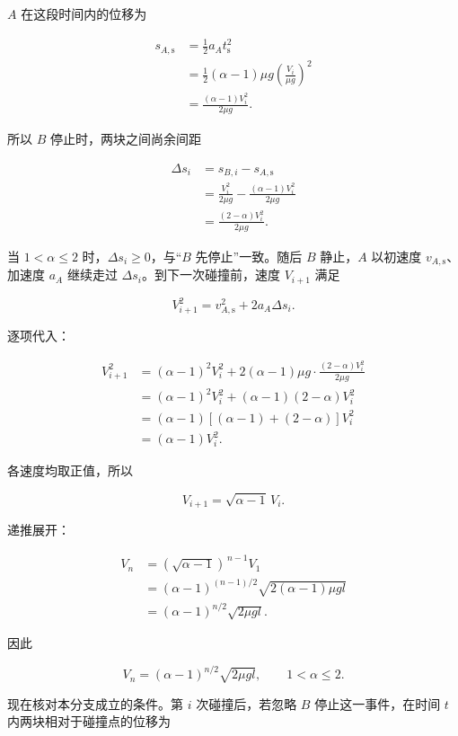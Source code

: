 \documentclass[12pt,a4paper,UTF8]{ctexart}
\begin{document}
\(A\) 在这段时间内的位移为

\[\begin{aligned}
s_{A,\mathrm s}
&=\frac12a_At_{\mathrm s}^2\\
&=\frac12(\alpha-1)\mu g
\left(\frac{V_i}{\mu g}\right)^2\\
&=\frac{(\alpha-1)V_i^2}{2\mu g}.
\end{aligned}\]

所以 \(B\) 停止时，两块之间尚余间距

\[\begin{aligned}
\Delta s_i
&=s_{B,i}-s_{A,\mathrm s}\\
&=\frac{V_i^2}{2\mu g}
-\frac{(\alpha-1)V_i^2}{2\mu g}\\
&=\frac{(2-\alpha)V_i^2}{2\mu g}.
\end{aligned}\]

当 \(1<\alpha\leq2\) 时，\(\Delta s_i\geq0\)，与``\(B\)
先停止''一致。随后 \(B\) 静止，\(A\) 以初速度
\(v_{A,\mathrm s}\)、加速度 \(a_A\) 继续走过
\(\Delta s_i\)。到下一次碰撞前，速度 \(V_{i+1}\) 满足

\[V_{i+1}^2
=v_{A,\mathrm s}^2+2a_A\Delta s_i.\]

逐项代入：

\[\begin{aligned}
V_{i+1}^2
&=(\alpha-1)^2V_i^2
+2(\alpha-1)\mu g
\cdot\frac{(2-\alpha)V_i^2}{2\mu g}\\
&=(\alpha-1)^2V_i^2
+(\alpha-1)(2-\alpha)V_i^2\\
&=(\alpha-1)
\left[(\alpha-1)+(2-\alpha)\right]V_i^2\\
&=(\alpha-1)V_i^2.
\end{aligned}\]

各速度均取正值，所以

\[V_{i+1}=\sqrt{\alpha-1}\,V_i.\]

递推展开：

\[\begin{aligned}
V_n
&=(\sqrt{\alpha-1})^{\,n-1}V_1\\
&=(\alpha-1)^{(n-1)/2}
\sqrt{2(\alpha-1)\mu gl}\\
&=(\alpha-1)^{n/2}\sqrt{2\mu gl}.
\end{aligned}\]

因此

\[\boxed{
V_n=(\alpha-1)^{n/2}\sqrt{2\mu gl},
\qquad 1<\alpha\leq2
}.\]

现在核对本分支成立的条件。第 \(i\) 次碰撞后，若忽略 \(B\)
停止这一事件，在时间 \(t\) 内两块相对于碰撞点的位移为
\end{document}
